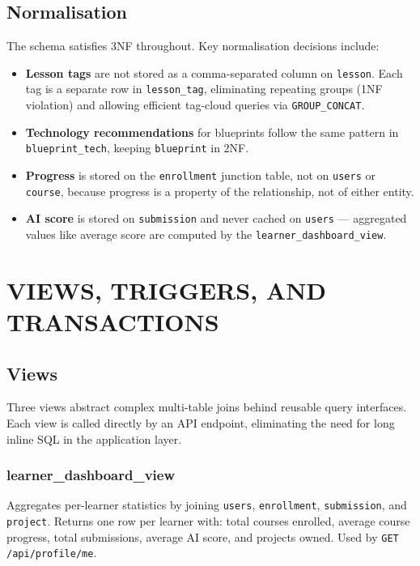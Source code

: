 \documentclass[12pt,a4paper]{article}
\begin{document}
\subsection{Normalisation}

The schema satisfies 3NF throughout. Key normalisation decisions include:

\begin{itemize}[itemsep=4pt]
    \item \textbf{Lesson tags} are not stored as a comma-separated column on \texttt{lesson}.
          Each tag is a separate row in \texttt{lesson\_tag}, eliminating repeating groups
          (1NF violation) and allowing efficient tag-cloud queries via \texttt{GROUP\_CONCAT}.
    \item \textbf{Technology recommendations} for blueprints follow the same pattern in
          \texttt{blueprint\_tech}, keeping \texttt{blueprint} in 2NF.
    \item \textbf{Progress} is stored on the \texttt{enrollment} junction table, not on
          \texttt{users} or \texttt{course}, because progress is a property of the relationship,
          not of either entity.
    \item \textbf{AI score} is stored on \texttt{submission} and never cached on \texttt{users}
          --- aggregated values like average score are computed by the \texttt{learner\_dashboard\_view}.
\end{itemize}

\section{VIEWS, TRIGGERS, AND TRANSACTIONS}

\subsection{Views}

Three views abstract complex multi-table joins behind reusable query interfaces. Each view is
called directly by an API endpoint, eliminating the need for long inline SQL in the application
layer.

\subsubsection{learner\_dashboard\_view}

Aggregates per-learner statistics by joining \texttt{users}, \texttt{enrollment},
\texttt{submission}, and \texttt{project}. Returns one row per learner with: total courses
enrolled, average course progress, total submissions, average AI score, and projects owned.
Used by \texttt{GET /api/profile/me}.
\end{document}

